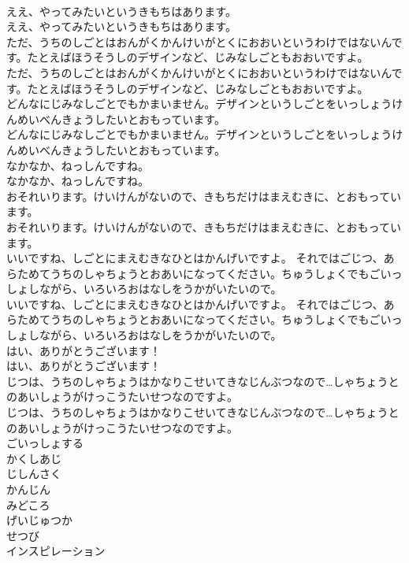 \documentclass[8pt]{extreport}
\begin{document}
\begin{CJK}{UTF8}{min}
\\	ええ、やってみたいというきもちはあります。
\\	ええ、やってみたいというきもちはあります。
\\	ただ、うちのしごとはおんがくかんけいがとくにおおいというわけではないんです。たとえばほうそうしのデザインなど、じみなしごともおおいですよ。
\\	ただ、うちのしごとはおんがくかんけいがとくにおおいというわけではないんです。たとえばほうそうしのデザインなど、じみなしごともおおいですよ。
\\	どんなにじみなしごとでもかまいません。デザインというしごとをいっしょうけんめいべんきょうしたいとおもっています。
\\	どんなにじみなしごとでもかまいません。デザインというしごとをいっしょうけんめいべんきょうしたいとおもっています。
\\	なかなか、ねっしんですね。
\\	なかなか、ねっしんですね。
\\	おそれいります。けいけんがないので、きもちだけはまえむきに、とおもっています。
\\	おそれいります。けいけんがないので、きもちだけはまえむきに、とおもっています。
\\	いいですね、しごとにまえむきなひとはかんげいですよ。 それではごじつ、あらためてうちのしゃちょうとおあいになってください。ちゅうしょくでもごいっしょしながら、いろいろおはなしをうかがいたいので。
\\	いいですね、しごとにまえむきなひとはかんげいですよ。 それではごじつ、あらためてうちのしゃちょうとおあいになってください。ちゅうしょくでもごいっしょしながら、いろいろおはなしをうかがいたいので。
\\	はい、ありがとうございます！
\\	はい、ありがとうございます！
\\	じつは、うちのしゃちょうはかなりこせいてきなじんぶつなので…しゃちょうとのあいしょうがけっこうたいせつなのですよ。
\\	じつは、うちのしゃちょうはかなりこせいてきなじんぶつなので…しゃちょうとのあいしょうがけっこうたいせつなのですよ。
\\	ごいっしょする
\\	かくしあじ
\\	じしんさく
\\	かんじん
\\	みどころ
\\	げいじゅつか
\\	せつび
\\	インスピレーション

\end{CJK}
\end{document}
